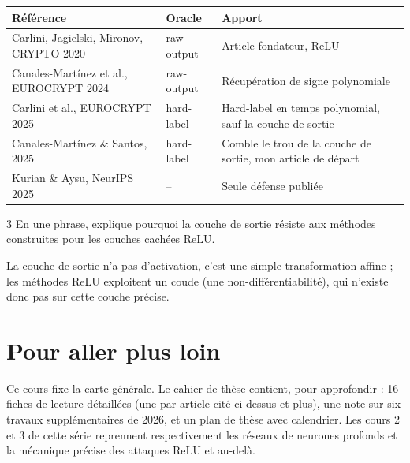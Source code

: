 \documentclass[11pt]{article}
\begin{document}
\begin{table}[h]
\centering
\small
\begin{tabular}{p{4.5cm}p{4.5cm}p{5.5cm}}
\toprule
Référence & Oracle & Apport \\
\midrule
Carlini, Jagielski, Mironov, CRYPTO 2020 & raw-output & Article fondateur, ReLU \\
Canales-Martínez et al., EUROCRYPT 2024 & raw-output & Récupération de signe polynomiale \\
Carlini et al., EUROCRYPT 2025 & hard-label & Hard-label en temps polynomial, sauf la couche de sortie \\
Canales-Martínez \& Santos, 2025 & hard-label & Comble le trou de la couche de sortie, mon article de départ \\
Kurian \& Aysu, NeurIPS 2025 & -- & Seule défense publiée \\
\bottomrule
\end{tabular}
\end{table}

\begin{exo}{3}
En une phrase, explique pourquoi la couche de sortie résiste aux méthodes construites pour les couches cachées ReLU.
\end{exo}
\begin{sol}
La couche de sortie n'a pas d'activation, c'est une simple transformation affine ; les méthodes ReLU exploitent un coude (une non-différentiabilité), qui n'existe donc pas sur cette couche précise.
\end{sol}

\section{Pour aller plus loin}

Ce cours fixe la carte générale. Le cahier de thèse contient, pour approfondir : 16 fiches de lecture détaillées (une par article cité ci-dessus et plus), une note sur six travaux supplémentaires de 2026, et un plan de thèse avec calendrier. Les cours 2 et 3 de cette série reprennent respectivement les réseaux de neurones profonds et la mécanique précise des attaques ReLU et au-delà.
\end{document}
